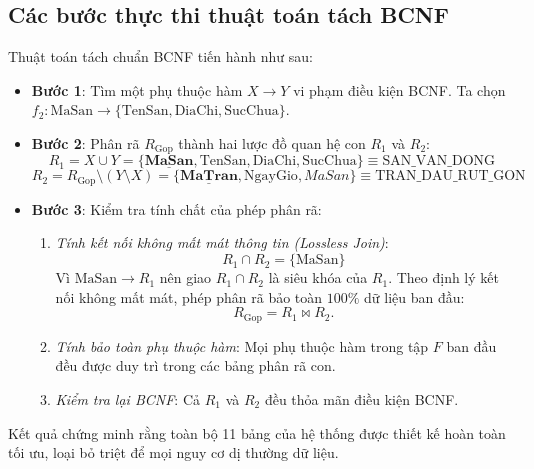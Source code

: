 \subsection{Các bước thực thi thuật toán tách BCNF}
Thuật toán tách chuẩn BCNF tiến hành như sau:
\begin{itemize}
    \item \textbf{Bước 1}: Tìm một phụ thuộc hàm $X \rightarrow Y$ vi phạm điều kiện BCNF. Ta chọn $f_2: \text{MaSan} \rightarrow \{\text{TenSan}, \text{DiaChi}, \text{SucChua}\}$.
    \item \textbf{Bước 2}: Phân rã $R_{\text{Gop}}$ thành hai lược đồ quan hệ con $R_1$ và $R_2$:
    $$R_1 = X \cup Y = \{\underline{\mathbf{MaSan}}, \text{TenSan}, \text{DiaChi}, \text{SucChua}\} \equiv \text{SAN\_VAN\_DONG}$$
    $$R_2 = R_{\text{Gop}} \setminus (Y \setminus X) = \{\underline{\mathbf{MaTran}}, \text{NgayGio}, \textit{MaSan}\} \equiv \text{TRAN\_DAU\_RUT\_GON}$$
    \item \textbf{Bước 3}: Kiểm tra tính chất của phép phân rã:
    \begin{enumerate}
        \item \textit{Tính kết nối không mất mát thông tin (Lossless Join)}:
        $$R_1 \cap R_2 = \{\text{MaSan}\}$$
        Vì $\text{MaSan} \rightarrow R_1$ nên giao $R_1 \cap R_2$ là siêu khóa của $R_1$. Theo định lý kết nối không mất mát, phép phân rã bảo toàn $100\%$ dữ liệu ban đầu:
        $$R_{\text{Gop}} = R_1 \bowtie R_2.$$
        \item \textit{Tính bảo toàn phụ thuộc hàm}: Mọi phụ thuộc hàm trong tập $F$ ban đầu đều được duy trì trong các bảng phân rã con.
        \item \textit{Kiểm tra lại BCNF}: Cả $R_1$ và $R_2$ đều thỏa mãn điều kiện BCNF.
    \end{enumerate}
\end{itemize}

Kết quả chứng minh rằng toàn bộ 11 bảng của hệ thống được thiết kế hoàn toàn tối ưu, loại bỏ triệt để mọi nguy cơ dị thường dữ liệu.
